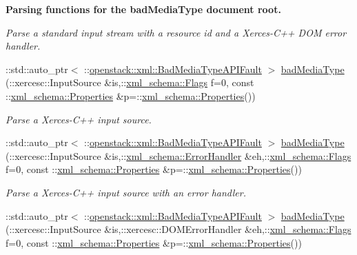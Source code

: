 \begin{Indent}{\bf Parsing functions for the badMediaType document root.}
\begin{DoxyCompactItemize}
\begin{DoxyCompactList}\small\item\em Parse a standard input stream with a resource id and a Xerces-\/C++ DOM error handler. \item\end{DoxyCompactList}\item 
::std::auto\_\-ptr$<$ ::\hyperlink{classopenstack_1_1xml_1_1BadMediaTypeAPIFault}{openstack::xml::BadMediaTypeAPIFault} $>$ \hyperlink{namespaceopenstack_1_1xml_a1ae95a20d2d563cd34b565d6e4a48cd8}{badMediaType} (::xercesc::InputSource \&is,::\hyperlink{namespacexml__schema_affb4c227cbd9aa7453dd1dc5a1401943}{xml\_\-schema::Flags} f=0, const ::\hyperlink{namespacexml__schema_ad27ce19a7ee1d3b1064092648898f64c}{xml\_\-schema::Properties} \&p=::\hyperlink{namespacexml__schema_ad27ce19a7ee1d3b1064092648898f64c}{xml\_\-schema::Properties}())
\begin{DoxyCompactList}\small\item\em Parse a Xerces-\/C++ input source. \item\end{DoxyCompactList}\item 
::std::auto\_\-ptr$<$ ::\hyperlink{classopenstack_1_1xml_1_1BadMediaTypeAPIFault}{openstack::xml::BadMediaTypeAPIFault} $>$ \hyperlink{namespaceopenstack_1_1xml_a90ce6ae758cbfc23ec08fa1f713a6eca}{badMediaType} (::xercesc::InputSource \&is,::\hyperlink{namespacexml__schema_ab1c9361bfd3b404eaabf0c31eded79dc}{xml\_\-schema::ErrorHandler} \&eh,::\hyperlink{namespacexml__schema_affb4c227cbd9aa7453dd1dc5a1401943}{xml\_\-schema::Flags} f=0, const ::\hyperlink{namespacexml__schema_ad27ce19a7ee1d3b1064092648898f64c}{xml\_\-schema::Properties} \&p=::\hyperlink{namespacexml__schema_ad27ce19a7ee1d3b1064092648898f64c}{xml\_\-schema::Properties}())
\begin{DoxyCompactList}\small\item\em Parse a Xerces-\/C++ input source with an error handler. \item\end{DoxyCompactList}\item 
::std::auto\_\-ptr$<$ ::\hyperlink{classopenstack_1_1xml_1_1BadMediaTypeAPIFault}{openstack::xml::BadMediaTypeAPIFault} $>$ \hyperlink{namespaceopenstack_1_1xml_addac679a1fb331cc4c975c7b69d23d44}{badMediaType} (::xercesc::InputSource \&is,::xercesc::DOMErrorHandler \&eh,::\hyperlink{namespacexml__schema_affb4c227cbd9aa7453dd1dc5a1401943}{xml\_\-schema::Flags} f=0, const ::\hyperlink{namespacexml__schema_ad27ce19a7ee1d3b1064092648898f64c}{xml\_\-schema::Properties} \&p=::\hyperlink{namespacexml__schema_ad27ce19a7ee1d3b1064092648898f64c}{xml\_\-schema::Properties}())

\end{DoxyCompactItemize}
\end{Indent}
